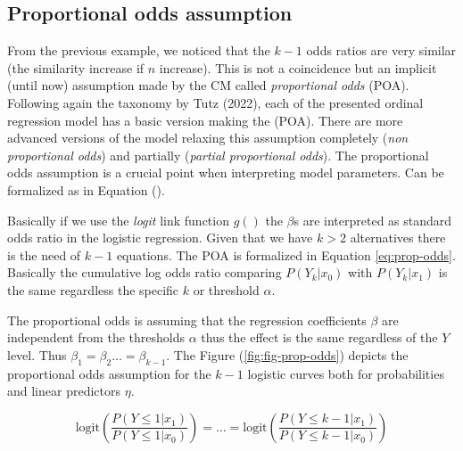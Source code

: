 \documentclass[
  man,floatsintext]{apa6}
\begin{document}
\normalsize

\subsection{Proportional odds assumption}\label{proportional-odds-assumption}

From the previous example, we noticed that the \(k - 1\) odds ratios are very similar (the similarity increase if \(n\) increase). This is not a coincidence but an implicit (until now) assumption made by the CM called \emph{proportional odds} (POA). Following again the taxonomy by Tutz (2022), each of the presented ordinal regression model has a basic version making the (POA). There are more advanced versions of the model relaxing this assumption completely (\emph{non proportional odds}) and partially (\emph{partial proportional odds}). The proportional odds assumption is a crucial point when interpreting model parameters. Can be formalized as in Equation ().

Basically if we use the \emph{logit} link function \(g()\) the \(\beta\)s are interpreted as standard odds ratio in the logistic regression. Given that we have \(k > 2\) alternatives there is the need of \(k - 1\) equations. The POA is formalized in Equation \eqref{eq:prop-odds}. Basically the cumulative log odds ratio comparing \(P(Y_k|x_0)\) with \(P(Y_k|x_1)\) is the same regardless the specific \(k\) or threshold \(\alpha\).

The proportional odds is assuming that the regression coefficients \(\beta\) are independent from the thresholds \(\alpha\) thus the effect is the same regardless of the \(Y\) level. Thus \(\beta_1 = \beta_2 \dots = \beta_{k - 1}\). The Figure (\ref{fig:fig-prop-odds}) depicts the proportional odds assumption for the \(k - 1\) logistic curves both for probabilities and linear predictors \(\eta\).

\begin{equation}
\text{logit} (\frac{P(Y \leq 1 |x_1)}{P(Y \leq 1 |x_0)}) = \dots = \text{logit} (\frac{P(Y \leq k - 1 |x_1)}{P(Y \leq k -1 |x_0)})
\label{eq:prop-odds}
\end{equation}

\scriptsize
\end{document}
